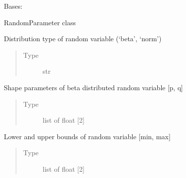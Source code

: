 \documentclass[letterpaper,10pt,english,openany,oneside]{sphinxmanual}
\begin{document}
\begin{fulllineitems}
\label{\detokenize{pygpc:pygpc.RandomParameter.RandomParameter}}
Bases: 

RandomParameter class

\begin{fulllineitems}
\label{\detokenize{pygpc:pygpc.RandomParameter.RandomParameter.pdf_type}}
Distribution type of random variable (‘beta’, ‘norm’)
\begin{quote}\begin{description}
\item[{Type}] \leavevmode
str

\end{description}\end{quote}

\end{fulllineitems}


\begin{fulllineitems}
\label{\detokenize{pygpc:pygpc.RandomParameter.RandomParameter.pdf_shape}}
Shape parameters of beta distributed random variable {[}p, q{]}
\begin{quote}\begin{description}
\item[{Type}] \leavevmode
list of float {[}2{]}

\end{description}\end{quote}

\end{fulllineitems}


\begin{fulllineitems}
\label{\detokenize{pygpc:pygpc.RandomParameter.RandomParameter.pdf_limits}}
Lower and upper bounds of random variable {[}min, max{]}
\begin{quote}\begin{description}
\item[{Type}] \leavevmode
list of float {[}2{]}


\end{description}
\end{quote}
\end{fulllineitems}
\end{fulllineitems}
\end{document}
